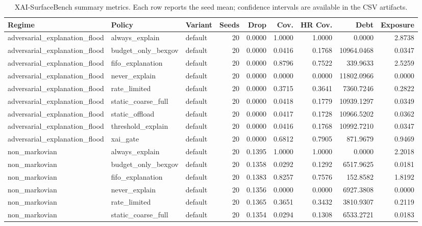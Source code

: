 \begin{table}[t]
\centering
\scriptsize
\caption{XAI-SurfaceBench summary metrics. Each row reports the seed mean; confidence intervals are available in the CSV artifacts.}
\begin{tabular}{lllrrrrrr}
\toprule
Regime & Policy & Variant & Seeds & Drop & Cov. & HR Cov. & Debt & Exposure \\
\midrule
adversarial\_explanation\_flood & always\_explain & default & 20 & 0.0000 & 1.0000 & 1.0000 & 0.0000 & 2.8738 \\
adversarial\_explanation\_flood & budget\_only\_bexgov & default & 20 & 0.0000 & 0.0416 & 0.1768 & 10964.0468 & 0.0347 \\
adversarial\_explanation\_flood & fifo\_explanation & default & 20 & 0.0000 & 0.8796 & 0.7522 & 339.9633 & 2.5259 \\
adversarial\_explanation\_flood & never\_explain & default & 20 & 0.0000 & 0.0000 & 0.0000 & 11802.0966 & 0.0000 \\
adversarial\_explanation\_flood & rate\_limited & default & 20 & 0.0000 & 0.3715 & 0.3641 & 7360.7246 & 0.2822 \\
adversarial\_explanation\_flood & static\_coarse\_full & default & 20 & 0.0000 & 0.0418 & 0.1779 & 10939.1297 & 0.0349 \\
adversarial\_explanation\_flood & static\_offload & default & 20 & 0.0000 & 0.0417 & 0.1728 & 10966.5202 & 0.0362 \\
adversarial\_explanation\_flood & threshold\_explain & default & 20 & 0.0000 & 0.0416 & 0.1768 & 10992.7210 & 0.0347 \\
adversarial\_explanation\_flood & xai\_gate & default & 20 & 0.0000 & 0.6812 & 0.7905 & 871.9679 & 0.9469 \\
non\_markovian & always\_explain & default & 20 & 0.1395 & 1.0000 & 1.0000 & 0.0000 & 2.2018 \\
non\_markovian & budget\_only\_bexgov & default & 20 & 0.1358 & 0.0292 & 0.1292 & 6517.9625 & 0.0181 \\
non\_markovian & fifo\_explanation & default & 20 & 0.1383 & 0.8257 & 0.7576 & 152.8582 & 1.8192 \\
non\_markovian & never\_explain & default & 20 & 0.1356 & 0.0000 & 0.0000 & 6927.3808 & 0.0000 \\
non\_markovian & rate\_limited & default & 20 & 0.1365 & 0.3651 & 0.3432 & 3810.9307 & 0.2119 \\
non\_markovian & static\_coarse\_full & default & 20 & 0.1354 & 0.0294 & 0.1308 & 6533.2721 & 0.0183 \\

\end{tabular}
\end{table}
